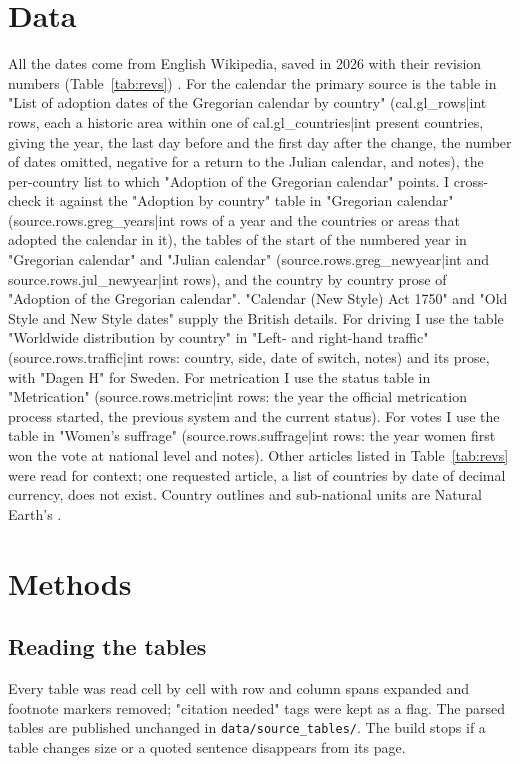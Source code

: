 \documentclass[11pt,a4paper]{article}
\begin{document}
\section{Data}
All the dates come from English Wikipedia, saved in 2026 with their revision numbers (Table~\ref{tab:revs}) \citep{wiki}. For the calendar the primary source is the table in "List of adoption dates of the Gregorian calendar by country" ({{cal.gl_rows|int}} rows, each a historic area within one of {{cal.gl_countries|int}} present countries, giving the year, the last day before and the first day after the change, the number of dates omitted, negative for a return to the Julian calendar, and notes), the per-country list to which "Adoption of the Gregorian calendar" points. I cross-check it against the "Adoption by country" table in "Gregorian calendar" ({{source.rows.greg_years|int}} rows of a year and the countries or areas that adopted the calendar in it), the tables of the start of the numbered year in "Gregorian calendar" and "Julian calendar" ({{source.rows.greg_newyear|int}} and {{source.rows.jul_newyear|int}} rows), and the country by country prose of "Adoption of the Gregorian calendar". "Calendar (New Style) Act 1750" and "Old Style and New Style dates" supply the British details. For driving I use the table "Worldwide distribution by country" in "Left- and right-hand traffic" ({{source.rows.traffic|int}} rows: country, side, date of switch, notes) and its prose, with "Dagen H" for Sweden. For metrication I use the status table in "Metrication" ({{source.rows.metric|int}} rows: the year the official metrication process started, the previous system and the current status). For votes I use the table in "Women's suffrage" ({{source.rows.suffrage|int}} rows: the year women first won the vote at national level and notes). Other articles listed in Table~\ref{tab:revs} were read for context; one requested article, a list of countries by date of decimal currency, does not exist. Country outlines and sub-national units are Natural Earth's \citep{naturalearth}.

\section{Methods}
\subsection{Reading the tables}
Every table was read cell by cell with row and column spans expanded and footnote markers removed; "citation needed" tags were kept as a flag. The parsed tables are published unchanged in \texttt{data/source\_tables/}. The build stops if a table changes size or a quoted sentence disappears from its page.
\end{document}
